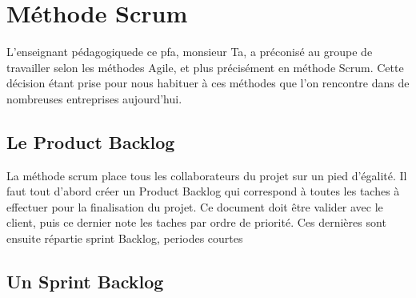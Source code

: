 \section{Méthode Scrum}
L'enseignant pédagogiquede ce pfa, monsieur Ta, a préconisé au groupe de travailler selon les méthodes Agile, et plus précisément en méthode Scrum.
Cette décision étant prise pour nous habituer à ces méthodes que l'on rencontre dans de nombreuses entreprises aujourd'hui.

\subsection*{Le Product Backlog}
La méthode scrum place tous les collaborateurs du projet sur un pied d'égalité. Il faut tout d'abord créer un Product Backlog qui correspond à toutes les taches à effectuer pour la finalisation du projet.
Ce document doit être valider avec le client, puis ce dernier note les taches par ordre de priorité. Ces dernières sont ensuite répartie sprint Backlog, periodes courtes 
\subsection*{Un Sprint Backlog}

\subsection*{}

